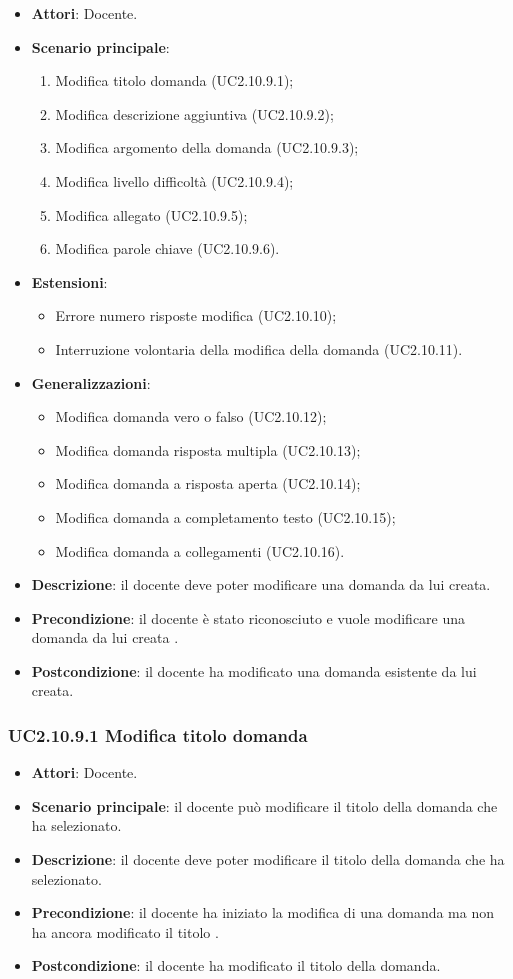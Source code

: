 \begin{itemize}
\item \textbf{Attori}: Docente.
\item \textbf{Scenario principale}:
\begin{enumerate}
\item Modifica titolo domanda
 (UC2.10.9.1);
\item Modifica descrizione aggiuntiva (UC2.10.9.2);
\item Modifica argomento della domanda (UC2.10.9.3);
\item Modifica livello difficoltà (UC2.10.9.4);
\item Modifica allegato (UC2.10.9.5);
\item Modifica parole chiave (UC2.10.9.6).
\end{enumerate}
\item \textbf{Estensioni}:
\begin{itemize}
\item Errore numero risposte modifica (UC2.10.10);
\item Interruzione volontaria della modifica della domanda (UC2.10.11).
\end{itemize}
\item \textbf{Generalizzazioni}:
\begin{itemize}
\item Modifica domanda vero o falso (UC2.10.12);
\item Modifica domanda risposta multipla (UC2.10.13);
\item Modifica domanda a risposta aperta (UC2.10.14);
\item Modifica domanda a completamento testo (UC2.10.15);
\item Modifica domanda a collegamenti (UC2.10.16).
\end{itemize}
\item \textbf{Descrizione}: il docente deve poter modificare una domanda da lui creata.
\item \textbf{Precondizione}: il docente è stato riconosciuto e vuole modificare una domanda da lui creata
.
\item \textbf{Postcondizione}: il docente ha modificato una domanda esistente da lui creata.
\end{itemize}
\subsubsection{UC2.10.9.1 Modifica titolo domanda
}
\begin{itemize}
\item \textbf{Attori}: Docente.
\item \textbf{Scenario principale}: il docente può modificare il titolo della domanda che ha selezionato.
\item \textbf{Descrizione}: il docente deve poter modificare il titolo della domanda che ha selezionato.
\item \textbf{Precondizione}: il docente ha iniziato la modifica di una domanda ma non ha ancora modificato il titolo
.
\item \textbf{Postcondizione}: il docente ha modificato il titolo della domanda.
\end{itemize}
